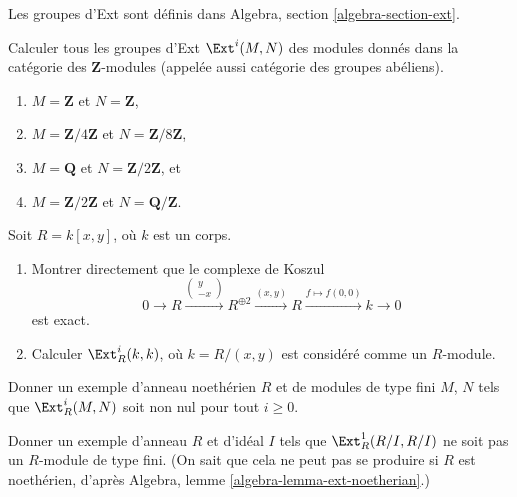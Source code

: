 \noindent
Les groupes d'Ext sont définis dans Algebra, section \ref{algebra-section-ext}.

\begin{exercise}
\label{exercise-compute-ext-abelian-groups}
Calculer tous les groupes d'Ext $\Ext^i(M, N)$ des modules donnés
dans la catégorie des $\mathbf{Z}$-modules
(appelée aussi catégorie des groupes abéliens).
\begin{enumerate}
\item $M = \mathbf{Z}$ et $N = \mathbf{Z}$,
\item $M = \mathbf{Z}/4\mathbf{Z}$ et $N = \mathbf{Z}/8\mathbf{Z}$,
\item $M = \mathbf{Q}$ et $N = \mathbf{Z}/2\mathbf{Z}$, et
\item $M = \mathbf{Z}/2\mathbf{Z}$ et $N = \mathbf{Q}/\mathbf{Z}$.
\end{enumerate}
\end{exercise}

\begin{exercise}
\label{exercise-compute-in-regular}
Soit $R = k[x, y]$, où $k$ est un corps.
\begin{enumerate}
\item Montrer directement que le complexe de Koszul
$$
0 \to R
\xrightarrow{
\left(
\begin{matrix}
y \\
-x
\end{matrix}
\right)
}
R^{\oplus 2} \xrightarrow{(x, y)} R \xrightarrow{f \mapsto f(0, 0)} k \to 0
$$
est exact.
\item Calculer $\Ext^i_R(k, k)$, où $k = R/(x, y)$ est considéré comme un $R$-module.
\end{enumerate}
\end{exercise}

\begin{exercise}
\label{exercise-infinitely-many-nonzero-ext}
Donner un exemple d'anneau noethérien $R$ et de modules de type fini $M$, $N$
tels que $\Ext^i_R(M, N)$ soit non nul pour tout $i \geq 0$.
\end{exercise}

\begin{exercise}
\label{exercise-infinite-ext}
Donner un exemple d'anneau $R$ et d'idéal $I$ tels que
$\Ext^1_R(R/I, R/I)$ ne soit pas un $R$-module de type fini.
(On sait que cela ne peut pas se produire si $R$ est noethérien, d'après
Algebra, lemme \ref{algebra-lemma-ext-noetherian}.)
\end{exercise}







